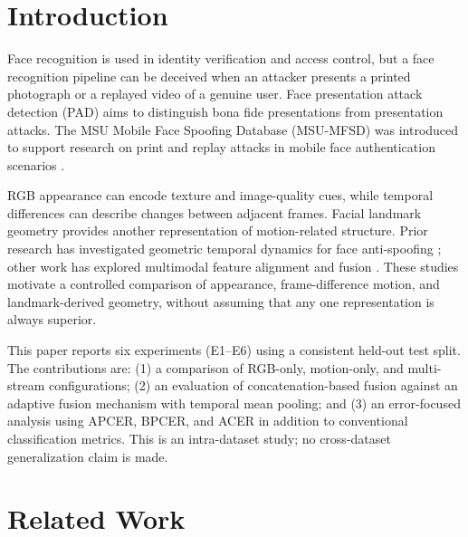 \documentclass[a4paper,conference]{IEEEtran}
\begin{document}
\section{Introduction}
Face recognition is used in identity verification and access control, but a face recognition pipeline can be deceived when an attacker presents a printed photograph or a replayed video of a genuine user. Face presentation attack detection (PAD) aims to distinguish bona fide presentations from presentation attacks. The MSU Mobile Face Spoofing Database (MSU-MFSD) was introduced to support research on print and replay attacks in mobile face authentication scenarios \cite{wen2015ida}.

RGB appearance can encode texture and image-quality cues, while temporal differences can describe changes between adjacent frames. Facial landmark geometry provides another representation of motion-related structure. Prior research has investigated geometric temporal dynamics for face anti-spoofing \cite{chang2023geometry}; other work has explored multimodal feature alignment and fusion \cite{chen2025mmfas}. These studies motivate a controlled comparison of appearance, frame-difference motion, and landmark-derived geometry, without assuming that any one representation is always superior.

This paper reports six experiments (E1--E6) using a consistent held-out test split. The contributions are: (1) a comparison of RGB-only, motion-only, and multi-stream configurations; (2) an evaluation of concatenation-based fusion against an adaptive fusion mechanism with temporal mean pooling; and (3) an error-focused analysis using APCER, BPCER, and ACER in addition to conventional classification metrics. This is an intra-dataset study; no cross-dataset generalization claim is made.

\section{Related Work}
\end{document}
